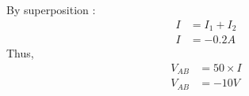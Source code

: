 \documentclass[journal,12pt,twocolumn]{IEEEtran}
\theoremstyle{remark}
\begin{document}
By superposition :   
\begin{align}
    I &= I_1 + I_2\\
    I &= -0.2A          
\end{align}
Thus,
\begin{align}  
    V_{AB} &= 50\times I\\
    V_{AB} &= -10 V \label{eq:gate_21_bm_finalans} 
\end{align}
\end{document}
